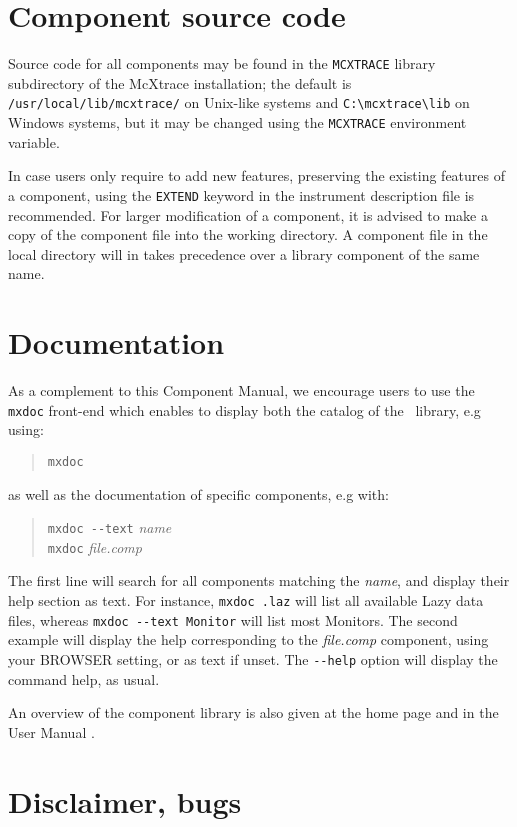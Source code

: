 \section{Component source code}
Source code for all components may be found in the \verb+MCXTRACE+ library
subdirectory of the McXtrace installation;
the default is \verb+/usr/local/lib/mcxtrace/+
on Unix-like systems and \verb+C:\mcxtrace\lib+ on Windows systems, but it may be
changed using the \verb+MCXTRACE+ environment variable.

In case users only require to add new features, preserving the existing features of a component, 
using the \verb+EXTEND+ keyword in the instrument description file is recommended. For larger modification of a component, it is advised to make a copy
of the component file into the working directory.
A component file in the local directory will in \MCX takes precedence over
a library component of the same name.

\section{Documentation}
As a complement to this Component Manual, we encourage users to use
the \verb+mxdoc+ front-end which enables to display both the
catalog of the \MCX\ library, e.g using: 
\begin{quote}
  \verb|mxdoc|
\end{quote}
as well as the documentation of specific components, e.g with:
\begin{quote}
  \verb|mxdoc --text| \textit{name} \\
  \verb|mxdoc| \textit{file.comp}
\end{quote}
The first line will search for all components matching the \textit{name},
and display their help section as text. For instance, \verb+mxdoc .laz+ will list all available Lazy data files, whereas \verb+mxdoc --text Monitor+ will list most Monitors.
The second example will display the help corresponding to
the \textit{file.comp} component, using your
BROWSER setting, or as text if unset.
The \verb+--help+ option will display the command help, as usual.

An overview of the component library is also given at the \MCX home page \cite{mcxtrace_webpage} and in the User Manual \cite{mcxtracemanual}.

\section{Disclaimer, bugs}

